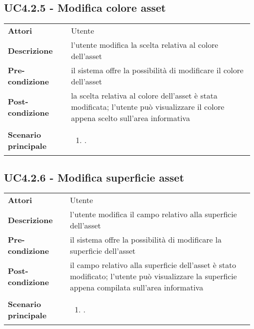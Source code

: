 \subsection{UC4.2.5 - Modifica colore asset} 
\label{sssec:UC4.2.5} 
\def\arraystretch{1.5}
\begin{tabularx}{\textwidth}{l|p{}}
	\rowcolor{I} \multicolumn{2}{c}{\color{white}\textbf{UC4.2.5 - Modifica colore asset}} \\
	\toprule
	\endhead
	\textbf{Attori} & Utente\\
	\textbf{Descrizione} & l'utente modifica la scelta relativa al colore dell'asset\\
	\textbf{Pre-condizione} & il sistema offre la possibilità di modificare il colore dell'asset\\
	\textbf{Post-condizione} & la scelta relativa al colore dell'asset è stata modificata; l'utente può visualizzare il colore appena scelto sull'area informativa\\
	\textbf{Scenario principale} & \vspace{-1.2em}\begin{enumerate}[leftmargin=*,noitemsep,nosep]
		\item \nameref{sssec:UC4.2.5}.
	\end{enumerate}\\
	\bottomrule
\end{tabularx}
\subsection{UC4.2.6 - Modifica superficie asset} 
\label{sssec:UC4.2.6} 
\def\arraystretch{1.5}
\begin{tabularx}{\textwidth}{l|p{}}
	\rowcolor{I} \multicolumn{2}{c}{\color{white}\textbf{UC4.2.6 - Modifica superficie asset}} \\
	\toprule
	\endhead
	\textbf{Attori} & Utente\\
	\textbf{Descrizione} & l'utente modifica il campo relativo alla superficie dell'asset\\
	\textbf{Pre-condizione} & il sistema offre la possibilità di modificare la superficie dell'asset\\
	\textbf{Post-condizione} & il campo relativo alla superficie dell'asset è stato modificato; l'utente può visualizzare la superficie appena compilata sull'area informativa\\
	\textbf{Scenario principale} & \vspace{-1.2em}\begin{enumerate}[leftmargin=*,noitemsep,nosep]
		\item \nameref{sssec:UC4.2.6}.
	\end{enumerate}\\
	\bottomrule
\end{tabularx}

